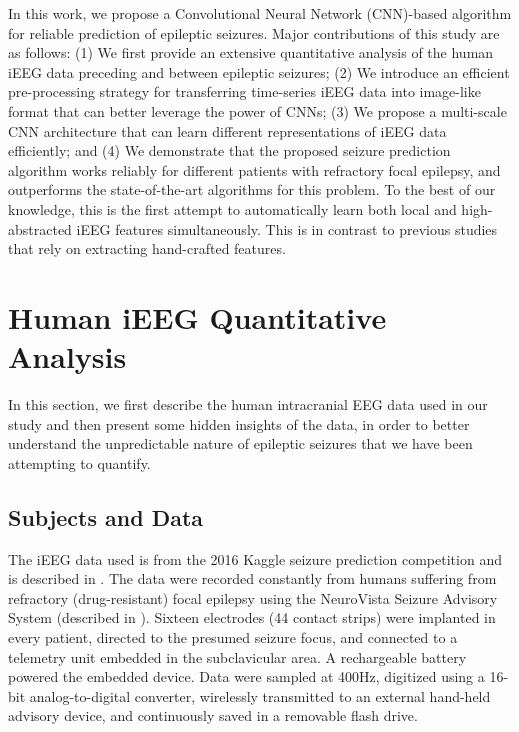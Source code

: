 \documentclass[journal]{IEEEtran}
\begin{document}
In this work, we propose a Convolutional Neural Network (CNN)-based algorithm for reliable prediction of epileptic seizures. Major contributions of this study are as follows: 
(1) We first provide an extensive quantitative analysis of the human iEEG data preceding and between epileptic seizures; 
(2) We introduce an efficient pre-processing strategy for transferring time-series iEEG data into image-like format that can better leverage the power of CNNs;
(3) We propose a multi-scale CNN architecture that can learn different representations of iEEG data efficiently; and
(4) We demonstrate that the proposed seizure prediction algorithm works reliably for different patients with refractory focal epilepsy, and outperforms the state-of-the-art algorithms for this problem.
To the best of our knowledge, this is the first attempt to automatically learn both local and high-abstracted iEEG features simultaneously. This is in contrast to previous studies that rely on extracting hand-crafted features.








\section{Human iEEG Quantitative Analysis}
\label{Section2}

In this section, we first describe the human intracranial EEG data used in our study and then present some hidden insights of the data, in order to better understand the unpredictable nature of epileptic seizures that we have been attempting to quantify.



\subsection{Subjects and Data}

The iEEG data used is from the 2016 Kaggle seizure prediction competition and is described in \cite{kuhlmann2018epilepsyecosystem}. The data were recorded constantly from humans suffering from refractory (drug-resistant) focal epilepsy using the NeuroVista Seizure Advisory System (described in \cite{cook2013prediction}). Sixteen electrodes (44 contact strips) were implanted in every patient, directed to the presumed seizure focus, and connected to a telemetry unit embedded in the subclavicular area. A rechargeable battery powered the embedded device. Data were sampled at 400Hz, digitized using a 16-bit analog-to-digital converter, wirelessly transmitted to an external hand-held advisory device, and continuously saved in a removable flash drive.
\end{document}
